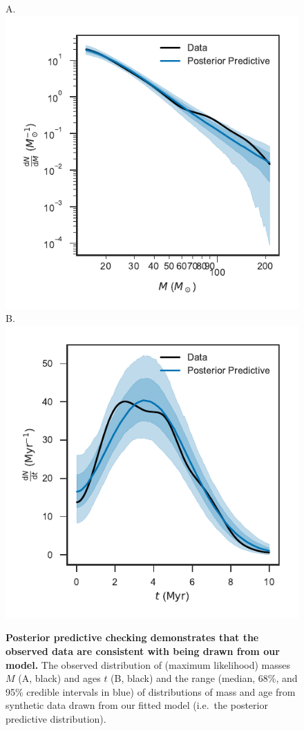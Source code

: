 \documentclass[12pt]{article}
\newcommand{\MSun}{M_\odot}
\begin{document}
\begin{figure}
    		    A.\\		\includegraphics[width=0.5\columnwidth]{dNdm-ppc-band.pdf}\\
               B.\\  \includegraphics[width=0.5\columnwidth]{dNdt-ppc-band.pdf}
    		\caption{{\bf Posterior predictive checking demonstrates that the observed data are consistent with being drawn from our model.} The observed distribution of (maximum likelihood) masses $M$ (A, black) and ages $t$ (B, black) and the range (median, 68\%, and 95\% credible intervals in blue) of distributions of mass and age from synthetic data drawn from our fitted model (i.e.\ the posterior predictive distribution).    %
		}\label{fig:PPC}
\end{figure}
\end{document}
